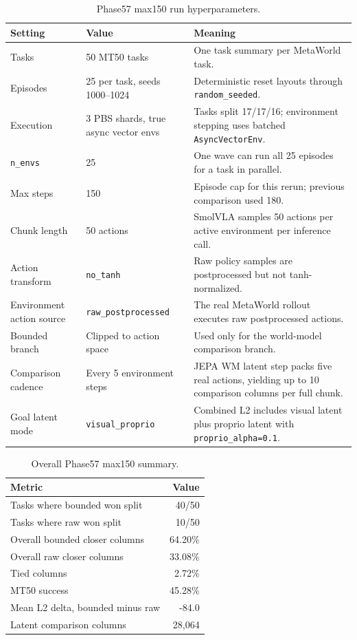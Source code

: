 \begin{table}[ht]
\centering
\caption{Phase57 max150 run hyperparameters.}
\label{tab:phase57-max150-hyperparameters}
\begin{tabularx}{\linewidth}{@{}l l X@{}}
\toprule
Setting & Value & Meaning \\
\midrule
Tasks & 50 MT50 tasks & One task summary per MetaWorld task. \\
Episodes & 25 per task, seeds 1000--1024 & Deterministic reset layouts through \texttt{random\_seeded}. \\
Execution & 3 PBS shards, true async vector envs & Tasks split 17/17/16; environment stepping uses batched \texttt{AsyncVectorEnv}. \\
\texttt{n\_envs} & 25 & One wave can run all 25 episodes for a task in parallel. \\
Max steps & 150 & Episode cap for this rerun; previous comparison used 180. \\
Chunk length & 50 actions & SmolVLA samples 50 actions per active environment per inference call. \\
Action transform & \texttt{no\_tanh} & Raw policy samples are postprocessed but not tanh-normalized. \\
Environment action source & \texttt{raw\_postprocessed} & The real MetaWorld rollout executes raw postprocessed actions. \\
Bounded branch & Clipped to action space & Used only for the world-model comparison branch. \\
Comparison cadence & Every 5 environment steps & JEPA WM latent step packs five real actions, yielding up to 10 comparison columns per full chunk. \\
Goal latent mode & \texttt{visual\_proprio} & Combined L2 includes visual latent plus proprio latent with \texttt{proprio\_alpha=0.1}. \\
\bottomrule
\end{tabularx}
\end{table}


\begin{table}[ht]
\centering
\caption{Overall Phase57 max150 summary.}
\label{tab:phase57-max150-overall}
\begin{tabular}{@{}l r@{}}
\toprule
Metric & Value \\
\midrule
Tasks where bounded won split & 40/50 \\
Tasks where raw won split & 10/50 \\
Overall bounded closer columns & 64.20\% \\
Overall raw closer columns & 33.08\% \\
Tied columns & 2.72\% \\
MT50 success & 45.28\% \\
Mean L2 delta, bounded minus raw & -84.0 \\
Latent comparison columns & 28,064 \\
\bottomrule
\end{tabular}
\end{table}


